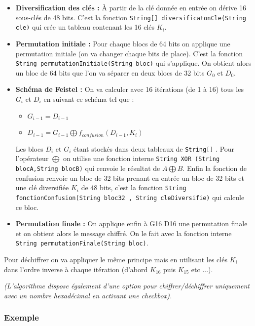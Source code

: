\documentclass{article}
\begin{document}
\begin{itemize}
\item \textbf{Diversification des clés : } À partir de la clé donnée en entrée on dérive 16 sous-clés de 48 bits. C'est la fonction \verb+String[] diversificatonCle(String cle)+ qui crée un tableau contenant les 16 clés $K_i$.
\item \textbf{Permutation initiale : } Pour chaque blocs de 64 bits on applique une permutation initiale (on va changer chaque bits de place). C'est la fonction \verb+String permutationInitiale(String bloc)+ qui s'applique. On obtient alors un bloc de 64 bits que l'on va séparer en deux blocs de 32 bits $G_0$ et $D_0$.
\item \textbf{Schéma de Feistel : } On va calculer avec 16 itérations (de 1 à 16) tous les $G_i$ et $D_i$ en suivant ce schéma tel que : 
\begin{itemize}
\item \(G_{i-1} = D_{i-1}\)
\item \(D_{i-1} = G_{i-1} \bigoplus f_{confusion}(D_{i-1} , K_i)\)
\end{itemize}
Les blocs $D_i$ et $G_i$ étant stockés dans deux tableaux de \verb+String[]+ . Pour l'opérateur $\bigoplus$ on utilise une fonction interne \verb+String XOR (String blocA,String blocB)+ qui renvoie le résultat de $A \bigoplus B$. Enfin la fonction de confusion renvoie un bloc de 32 bits prenant en entrée un bloc de 32 bits et une clé diversifiée $K_i$ de 48 bits, c'est la fonction \verb+String fonctionConfusion(String bloc32 , String cleDiversifie)+ qui calcule ce bloc.

\item \textbf{Permutation finale : } On applique enfin à G16 D16 une permutation finale et on obtient alors le message chiffré. On le fait avec la fonction interne \verb+String permutationFinale(String bloc)+. 
\end{itemize}
\vspace{1\baselineskip}


Pour déchiffrer on va appliquer le même principe mais en utilisant les clés $K_i$ dans l'ordre inverse à chaque itération (d'abord $K_{16}$ puis $K_{15}$ etc ...).
\vspace{1\baselineskip}

\textit{(L'algorithme dispose également d'une option pour chiffrer/déchiffrer uniquement avec un nombre hexadécimal en activant une checkbox).}

\subsubsection{Exemple}
\end{document}
